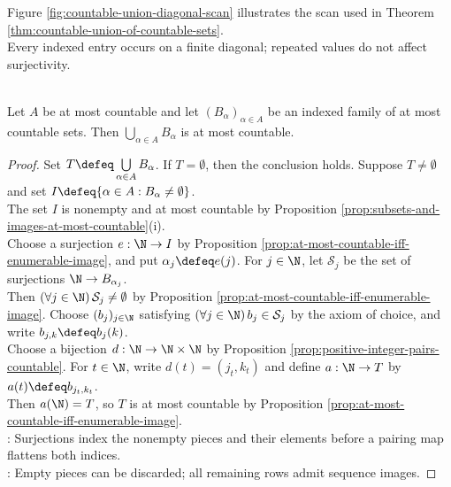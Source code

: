 \begin{illustrationfigure}[H]
  
  \caption{Diagonal scan of countable rows into one surjective sequence.}
  \label{fig:countable-union-diagonal-scan}
\end{illustrationfigure}

Figure \ref{fig:countable-union-diagonal-scan} illustrates the scan used in Theorem \ref{thm:countable-union-of-countable-sets}.\\
Every indexed entry occurs on a finite diagonal; repeated values do not affect surjectivity.

\begin{corollary} \label{cor:at-most-countable-union-at-most-countable} \\
Let $A$ be at most countable and let $(B_\alpha)_{\alpha\in A}$ be an indexed family of at most countable sets. Then $\bigcup\limits_{\alpha\in A}B_\alpha$ is at most countable.
\begin{proof}
Set $T\defeq\bigcup\limits_{\alpha\in A}B_\alpha$. If $T=\emptyset$, then the conclusion holds. Suppose $T\neq\emptyset$ and set $I\defeq\{\alpha\in A:B_\alpha\neq\emptyset\}$.\\
The set $I$ is nonempty and at most countable by Proposition \ref{prop:subsets-and-images-at-most-countable}(i).\\
Choose a surjection $e:\N\to I$ by Proposition \ref{prop:at-most-countable-iff-enumerable-image}, and put $\alpha_j\defeq e(j)$. For $j\in\N$, let $\mathcal{S}_j$ be the set of surjections $\N\to B_{\alpha_j}$.\\
Then $(\forall j\in\N)\,\mathcal{S}_j\neq\emptyset$ by Proposition \ref{prop:at-most-countable-iff-enumerable-image}. Choose $(b_j)_{j\in\N}$ satisfying $(\forall j\in\N)\,b_j\in\mathcal{S}_j$ by the axiom of choice, and write $b_{j,k}\defeq b_j(k)$.\\
Choose a bijection $d:\N\to\N\times\N$ by Proposition \ref{prop:positive-integer-pairs-countable}. For $t\in\N$, write $d(t)=(j_t,k_t)$ and define $a:\N\to T$ by $a(t)\defeq b_{j_t,k_t}$.\\
Then $a(\N)=T$, so $T$ is at most countable by Proposition \ref{prop:at-most-countable-iff-enumerable-image}.\\
: Surjections index the nonempty pieces and their elements before a pairing map flattens both indices.\\
: Empty pieces can be discarded; all remaining rows admit sequence images.
\end{proof}
\end{corollary}

